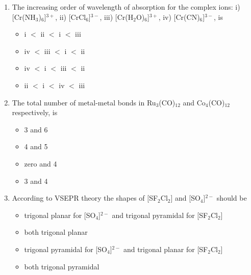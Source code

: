 \documentclass[journal,12pt,onecolumn]{IEEEtran}
\theoremstyle{remark}
\begin{document}
\begin{enumerate}
\item    \hspace{0.5cm} The increasing order of wavelength of absorption for the complex ions:  
i) [Cr(NH$_3$)$_6$]$^{3+}$, ii) [CrCl$_6$]$^{3-}$, iii) [Cr(H$_2$O)$_6$]$^{3+}$, iv) [Cr(CN)$_6$]$^{3-}$, is  \hfill{}

\begin{multicols}{2}
\begin{itemize}[label=(A)]
    \item i $<$ ii $<$ i $<$ iii
    \item iv $<$ iii $<$ i $<$ ii
    \item iv $<$ i $<$ iii $<$ ii
    \item ii $<$ i $<$ iv $<$ iii
\end{itemize}
\end{multicols}
 

\item    \hspace{0.5cm} The total number of metal-metal bonds in Ru$_3$(CO)$_{12}$ and Co$_4$(CO)$_{12}$ respectively, is  \hfill{}

\begin{multicols}{2}
\begin{itemize}[label=(A)]
    \item 3 and 6
    \item 4 and 5
    \item zero and 4
    \item 3 and 4
\end{itemize}
\end{multicols}

\item    \hspace{0.5cm} According to VSEPR theory the shapes of [SF$_2$Cl$_2$] and [SO$_4$]$^{2-}$ should be  \hfill{}

\begin{multicols}{2}
\begin{itemize}[label=(A)]
    \item trigonal planar for [SO$_4$]$^{2-}$ and trigonal pyramidal for [SF$_2$Cl$_2$]
    \item both trigonal planar
    \item trigonal pyramidal for [SO$_4$]$^{2-}$ and trigonal planar for [SF$_2$Cl$_2$]
    \item both trigonal pyramidal
\end{itemize}
\end{multicols}


\end{enumerate}
\end{document}
